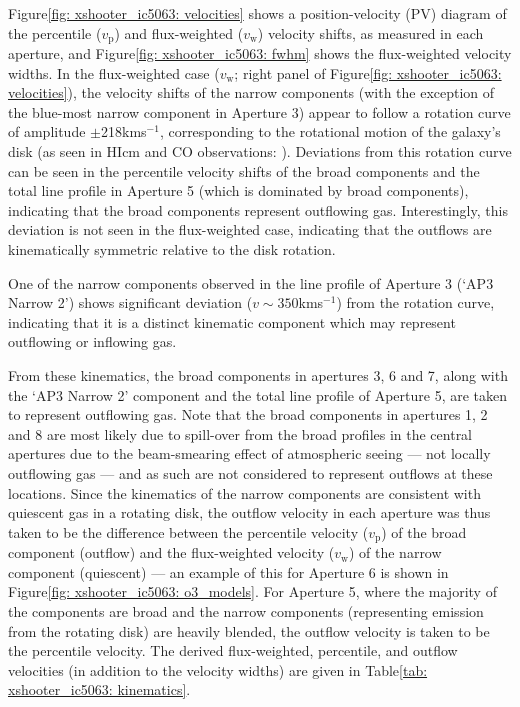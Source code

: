 \newpage
Figure\;\ref{fig: xshooter_ic5063: velocities} shows a position-velocity (PV) diagram of the percentile ($v_\mathrm{p}$) and flux-weighted ($v_\mathrm{w}$) velocity shifts, as measured in each aperture, and Figure\;\ref{fig: xshooter_ic5063: fwhm} shows the flux-weighted velocity widths. In the flux-weighted case ($v_\mathrm{w}$; right panel of Figure\;\ref{fig: xshooter_ic5063: velocities}), the velocity shifts of the narrow components (with the exception of the blue-most narrow component in Aperture 3) appear to follow a rotation curve of amplitude $\pm$218\;km\;s$^{-1}$, corresponding to the rotational motion of the galaxy's disk (as seen in HI\;cm and CO observations: \citealt{Morganti1998, Morganti2015, Oosterloo2017}). Deviations from this rotation curve can be seen in the percentile velocity shifts of the broad components and the total line profile in Aperture 5 (which is dominated by broad components), indicating that the broad components represent outflowing gas. Interestingly, this deviation is not seen in the flux-weighted case, indicating that the outflows are kinematically symmetric relative to the disk rotation. 

One of the narrow components observed in the line profile of Aperture 3 (`AP3 Narrow 2') shows significant deviation ($v\sim350$\;km\;s$^{-1}$) from the rotation curve, indicating that it is a distinct kinematic component which may represent outflowing or inflowing gas. 

From these kinematics, the broad components in apertures 3, 6 and 7, along with the `AP3 Narrow 2' component and the total line profile of Aperture 5, are taken to represent outflowing gas. Note that the broad components in apertures 1, 2 and 8 are most likely due to spill-over from the broad profiles in the central apertures due to the beam-smearing effect of atmospheric seeing --- not locally outflowing gas --- and as such are not considered to represent outflows at these locations. Since the kinematics of the narrow components are consistent with quiescent gas in a rotating disk, the outflow velocity in each aperture was thus taken to be the difference between the percentile velocity ($v_\mathrm{p}$) of the broad component (outflow) and the flux-weighted velocity ($v_\mathrm{w}$) of the narrow component (quiescent) --- an example of this for Aperture 6 is shown in Figure\;\ref{fig: xshooter_ic5063: o3_models}. For Aperture 5, where the majority of the components are broad and the narrow components (representing emission from the rotating disk) are heavily blended, the outflow velocity is taken to be the percentile velocity. The derived flux-weighted, percentile, and outflow velocities (in addition to the velocity widths) are given in Table\;\ref{tab: xshooter_ic5063: kinematics}.


